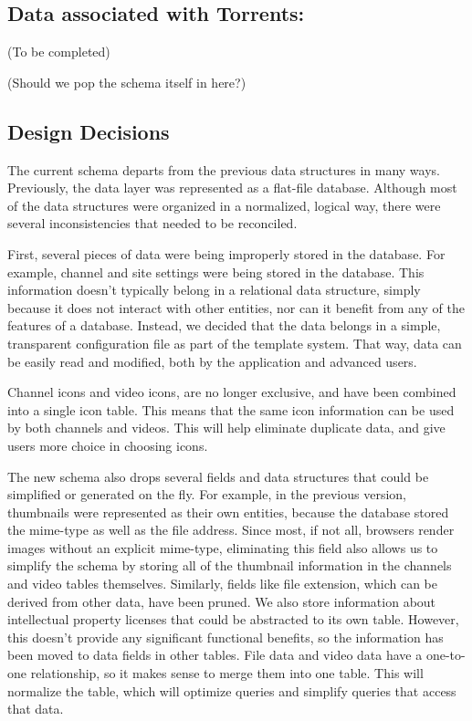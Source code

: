 \documentclass[a4paper,12pt]{report}
\begin{document}
\subsection{Data associated with Torrents:}
(To be completed)

(Should we pop the schema itself in here?)

\subsection{Design Decisions}
The current schema departs from the previous data structures in many ways.
Previously, the data layer was represented as a flat-file database.
Although most of the data structures were organized in a normalized, logical way, there were several inconsistencies that needed to be reconciled.

First, several pieces of data were being improperly stored in the database. 
For example, channel and site settings were being stored in the database. 
This information doesn't typically belong in a relational data structure, simply because it does not interact with other entities, nor can it benefit from any of the features of a database. 
Instead, we decided that the data belongs in a simple, transparent configuration file as part of the template system. 
That way, data can be easily read and modified, both by the application and advanced users. 

Channel icons and video icons, are no longer exclusive, and have been combined into a single icon table.
This means that the same icon information can be used by both channels and videos. This will help eliminate duplicate data, and give users more choice in choosing icons.

The new schema also drops several fields and data structures that could be simplified or generated on the fly.
For example, in the previous version, thumbnails were represented as their own entities, because the database stored the mime-type as well as the file address.
Since most, if not all, browsers render images without an explicit mime-type, eliminating this field also allows us to simplify the schema by storing all of the thumbnail information in the channels and video tables themselves.
Similarly, fields like file extension, which can be derived from other data, have been pruned.
We also store information about intellectual property licenses that could be abstracted to its own table.
However, this doesn't provide any significant functional benefits, so the information has been moved to data fields in other tables. 
File data and video data have a one-to-one relationship, so it makes sense to merge them into one table.
This will normalize the table, which will optimize queries and simplify queries that access that data.
\end{document}
